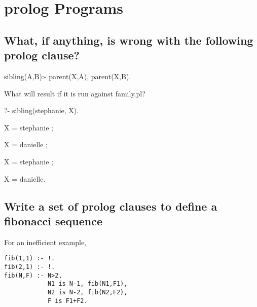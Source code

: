 \documentclass[]{article}
\begin{document}
\newpage
\section{prolog Programs}
\subsection{What, if anything, is wrong with the following prolog clause?}
sibling(A,B):- parent(X,A), parent(X,B).
\vspace{5mm}

  What will result if it is run against family.pl?
\vspace{4mm}

?- sibling(stephanie, X).

X = stephanie ;

X = danielle ;

X = stephanie ;

X = danielle.
\vspace{4mm}


\subsection{Write a set of prolog clauses to define a fibonacci sequence}
\vspace{4mm}

For an inefficient example, 
\begin{verbatim}
fib(1,1) :- !.
fib(2,1) :- !.
fib(N,F) :- N>2,
            N1 is N-1, fib(N1,F1),
            N2 is N-2, fib(N2,F2),
            F is F1+F2.

\end{verbatim}
\end{document}
